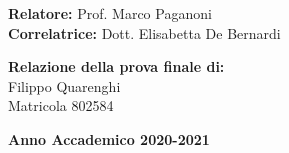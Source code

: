 \begin{titlepage}
        \vspace{40mm}

        \begin{flushleft}
        

        \noindent
        {\large \textbf{Relatore:} Prof. Marco Paganoni } \\

        \noindent
        {\large \textbf{Correlatrice:} Dott. Elisabetta De Bernardi}
        \end{flushleft}
        
        \vspace{10mm}

        \begin{flushright}
            {\large \textbf{Relazione della prova finale di:}} \\
            \large{Filippo Quarenghi} \\
            \large{Matricola 802584} 
        \end{flushright}
        
        \vspace{10mm}
        \begin{center}
            {\large{\bf Anno Accademico 2020-2021}}
        \end{center}

        \restoregeometry
        
    \end{titlepage}